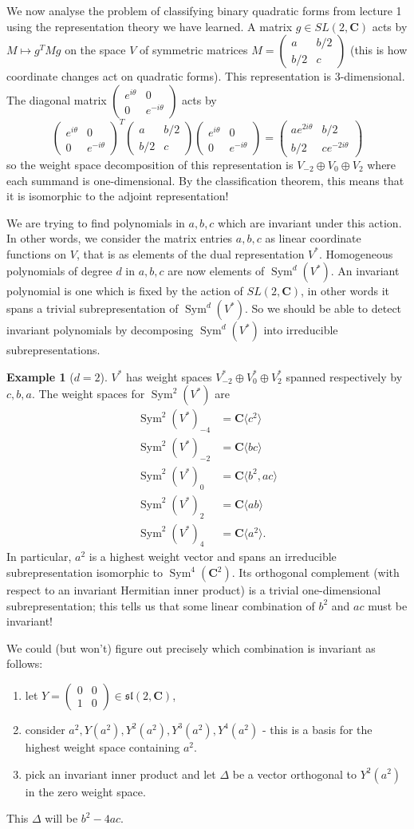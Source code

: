 \documentclass[12pt]{article}
\newcommand{\CC}{\mathbf{C}}
\newcommand{\OP}{\operatorname}
\newcommand{\matr}[4]{\left(\begin{array}{cc}#1 & #2\\ #3 & #4\end{array}\right)}
\theoremstyle{definition}
\newtheorem{exm}[thm]{Example}
\theoremstyle{check}
\theoremstyle{remark}
\theoremstyle{TheoremNum}
\begin{document}
We now analyse the problem of classifying binary quadratic forms from lecture 1 using the representation theory we have learned. A matrix $g\in SL(2,\CC)$ acts by $M\mapsto g^TMg$ on the space $V$ of symmetric matrices $M=\matr{a}{b/2}{b/2}{c}$ (this is how coordinate changes act on quadratic forms). This representation is 3-dimensional. The diagonal matrix $\matr{e^{i\theta}}{0}{0}{e^{-i\theta}}$ acts by
\[\matr{e^{i\theta}}{0}{0}{e^{-i\theta}}^T\matr{a}{b/2}{b/2}{c}\matr{e^{i\theta}}{0}{0}{e^{-i\theta}}=\matr{ae^{2i\theta}}{b/2}{b/2}{ce^{-2i\theta}}\]
so the weight space decomposition of this representation is $V_{-2}\oplus V_0\oplus V_2$ where each summand is one-dimensional. By the classification theorem, this means that it is isomorphic to the adjoint representation!

We are trying to find polynomials in $a,b,c$ which are invariant under this action. In other words, we consider the matrix entries $a,b,c$ as linear coordinate functions on $V$, that is as elements of the dual representation $V^*$. Homogeneous polynomials of degree $d$ in $a,b,c$ are now elements of $\OP{Sym}^d(V^*)$. An invariant polynomial is one which is fixed by the action of $SL(2,\CC)$, in other words it spans a trivial subrepresentation of $\OP{Sym}^d(V^*)$. So we should be able to detect invariant polynomials by decomposing $\OP{Sym}^d(V^*)$ into irreducible subrepresentations.

\begin{exm}[$d=2$]
$V^*$ has weight spaces $V_{-2}^*\oplus V_0^*\oplus V_2^*$ spanned respectively by $c,b,a$. The weight spaces for $\OP{Sym}^2(V^*)$ are
\begin{align*}
\OP{Sym}^2(V^*)_{-4}&=\CC\langle c^2\rangle\\
\OP{Sym}^2(V^*)_{-2}&=\CC\langle bc\rangle\\
\OP{Sym}^2(V^*)_{0}&=\CC\langle b^2,ac\rangle\\
\OP{Sym}^2(V^*)_{2}&=\CC\langle ab\rangle\\
\OP{Sym}^2(V^*)_{4}&=\CC\langle a^2\rangle.
\end{align*}
In particular, $a^2$ is a highest weight vector and spans an irreducible subrepresentation isomorphic to $\OP{Sym}^4(\CC^2)$. Its orthogonal complement (with respect to an invariant Hermitian inner product) is a trivial one-dimensional subrepresentation; this tells us that some linear combination of $b^2$ and $ac$ must be invariant!

We could (but won't) figure out precisely which combination is invariant as follows:
\begin{enumerate}
\item let $Y=\matr{0}{0}{1}{0}\in\mathfrak{sl}(2,\CC)$,
\item consider $a^2,Y(a^2),Y^2(a^2),Y^3(a^2),Y^4(a^2)$ - this is a basis for the highest weight space containing $a^2$.
\item pick an invariant inner product and let $\Delta$ be a vector orthogonal to $Y^2(a^2)$ in the zero weight space.
\end{enumerate}
This $\Delta$ will be $b^2-4ac$.
\end{exm}
\end{document}
